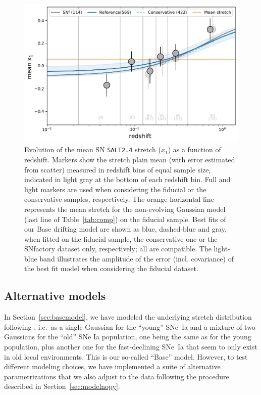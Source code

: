 \documentclass[]{aa}
\begin{document}
\begin{figure}
    \centering
    \includegraphics[width=0.7\linewidth]{Article_figures/stretchevol_all_vs_snf-mean.pdf}
    \caption{Evolution of the mean SN \textsc{\texttt{SALT2.4}} stretch ($x_1$)
        as a function of redshift. Markers show the stretch plain mean
        (with error estimated from scatter) measured in redshift bins of equal
        sample size, indicated in light gray at the bottom of each redshift bin.
        Full and light markers are used when considering the fiducial or the
        conservative samples, respectively. The orange horizontal line
        represents the mean stretch for the non-evolving Gaussian model
        (last line of Table~\ref{tab:comp}) on the fiducial sample. Best
        fits of our Base drifting model are shown as blue, dashed-blue and
        gray, when fitted on the fiducial sample, the conservative one or
        the SNfactory dataset only, respectively; all are compatible. The
        light-blue band illustrates the amplitude of the error (incl.
        covariance) of the best fit model when considering the fiducial
    dataset.}
    \label{fig:modelall}
\end{figure}

\subsection{Alternative models}\label{sec:othermodel}

In Section~\ref{sec:basemodel}, we have modeled the underlying stretch
distribution following \cite{rigault2020}, i.e.\ as a single Gaussian for the
``young'' SNe~Ia and a mixture of two Gaussians for the ``old'' SNe Ia
population, one being the same as for the young population, plus another one for
the fast-declining SNe~Ia that seem to only exist in old local environments.
This is our so-called ``Base'' model. However, to test different modeling
choices, we have implemented a suite of alternative parametrizations that we
also adjust to the data following the procedure described in
Section~\ref{sec:modelnopy}. 
\end{document}
